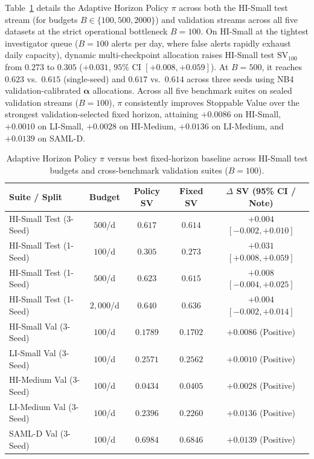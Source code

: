 \documentclass[pdflatex,sn-mathphys,Numbered]{sn-jnl}
\theoremstyle{thmstyleone}
\begin{document}
Table~\ref{tab:policy_results} details the Adaptive Horizon Policy $\pi$ across both the HI-Small test stream (for budgets $B \in \{100, 500, 2000\}$) and validation streams across all five datasets at the strict operational bottleneck $B = 100$. On HI-Small at the tightest investigator queue ($B = 100$ alerts per day, where false alerts rapidly exhaust daily capacity), dynamic multi-checkpoint allocation raises HI-Small test $\text{SV}_{100}$ from $0.273$ to $0.305$ ($+0.031$, $95\%$ CI $[+0.008, +0.059]$). At $B = 500$, it reaches $0.623$ vs.\ $0.615$ (single-seed) and $0.617$ vs.\ $0.614$ across three seeds using NB4 validation-calibrated $\boldsymbol{\alpha}$ allocations. Across all five benchmark suites on sealed validation streams ($B = 100$), $\pi$ consistently improves Stoppable Value over the strongest validation-selected fixed horizon, attaining $+0.0086$ on HI-Small, $+0.0010$ on LI-Small, $+0.0028$ on HI-Medium, $+0.0136$ on LI-Medium, and $+0.0139$ on SAML-D.

\begin{table}[t]
\centering
\caption{Adaptive Horizon Policy $\pi$ versus best fixed-horizon baseline across HI-Small test budgets and cross-benchmark validation suites ($B = 100$).}
\label{tab:policy_results}
\scriptsize
\setlength{\tabcolsep}{2.8pt}
\begin{tabular}{@{}lcccc@{}}
\toprule
\textbf{Suite / Split} & \textbf{Budget} & \textbf{Policy SV} & \textbf{Fixed SV} & \textbf{$\Delta$ SV (95\% CI / Note)} \\
\midrule
HI-Small Test (3-Seed) & $500$/d & $0.617$ & $0.614$ & $+0.004$ $[-0.002, +0.010]$ \\
HI-Small Test (1-Seed) & $100$/d & $0.305$ & $0.273$ & $+0.031$ $[+0.008, +0.059]$ \\
HI-Small Test (1-Seed) & $500$/d & $0.623$ & $0.615$ & $+0.008$ $[-0.004, +0.025]$ \\
HI-Small Test (1-Seed) & $2{,}000$/d & $0.640$ & $0.636$ & $+0.004$ $[-0.002, +0.014]$ \\
\midrule
HI-Small Val (3-Seed) & $100$/d & $0.1789$ & $0.1702$ & $+0.0086$ (Positive) \\
LI-Small Val (3-Seed) & $100$/d & $0.2571$ & $0.2562$ & $+0.0010$ (Positive) \\
HI-Medium Val (3-Seed) & $100$/d & $0.0434$ & $0.0405$ & $+0.0028$ (Positive) \\
LI-Medium Val (3-Seed) & $100$/d & $0.2396$ & $0.2260$ & $+0.0136$ (Positive) \\
SAML-D Val (3-Seed) & $100$/d & $0.6984$ & $0.6846$ & $+0.0139$ (Positive) \\
\bottomrule
\end{tabular}
\end{table}
\end{document}
